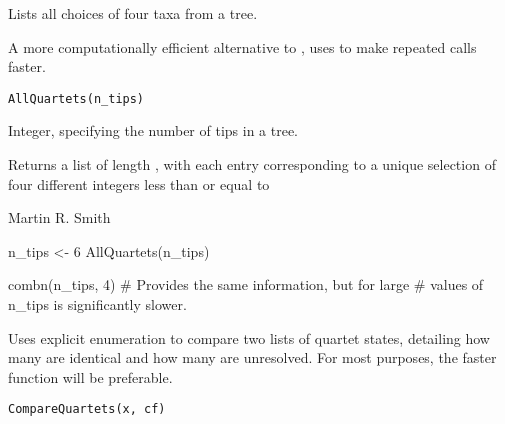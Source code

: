 \documentclass[a4paper]{book}
\begin{document}
%
\begin{Description}\relax
Lists all choices of four taxa from a tree.

A more computationally efficient alternative to ,
 uses  to make repeated calls faster.
\end{Description}
%
\begin{Usage}
\begin{verbatim}
AllQuartets(n_tips)
\end{verbatim}
\end{Usage}
%
\begin{Arguments}
\begin{ldescription}
\item[\code{n\_tips}] Integer, specifying the number of tips in a tree.
\end{ldescription}
\end{Arguments}
%
\begin{Value}
Returns a list of length , with each entry
corresponding to a unique selection of four different integers less than
or equal to 
\end{Value}
%
\begin{Author}\relax
Martin R. Smith
\end{Author}
%
\begin{SeeAlso}\relax
{}
\end{SeeAlso}
%
\begin{Examples}
\begin{ExampleCode}
 n_tips <- 6
 AllQuartets(n_tips)
 
 combn(n_tips, 4) # Provides the same information, but for large 
                  # values of n_tips is significantly slower.

\end{ExampleCode}
\end{Examples}
%
\begin{Description}\relax
Uses explicit enumeration to compare two lists of quartet states,
detailing how many are identical and how many are unresolved.
For most purposes, the faster function  will be preferable.
\end{Description}
%
\begin{Usage}
\begin{verbatim}
CompareQuartets(x, cf)
\end{verbatim}
\end{Usage}
\end{document}
